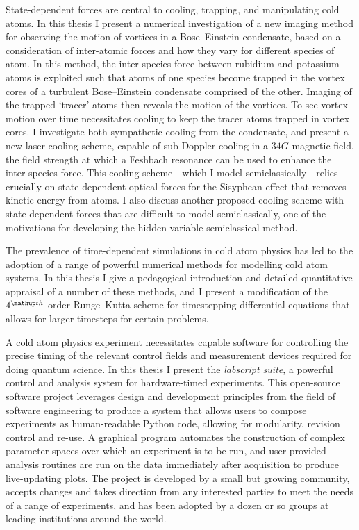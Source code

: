 State-dependent forces are central to cooling, trapping, and manipulating cold atoms. In this thesis I present a numerical investigation of a new imaging method for observing the motion of vortices in a Bose--Einstein condensate, based on a consideration of inter-atomic forces and how they vary for different species of atom. In this method, the inter-species force between rubidium and potassium atoms is exploited such that atoms of one species become trapped in the vortex cores of a turbulent Bose--Einstein condensate comprised of the other. Imaging of the trapped `tracer' atoms then reveals the motion of the vortices. To see vortex motion over time necessitates cooling to keep the tracer atoms trapped in vortex cores. I investigate both sympathetic cooling from the condensate, and present a new laser cooling scheme, capable of sub-Doppler cooling in a $34\unit{G}$ magnetic field, the field strength at which a Feshbach resonance can be used to enhance the inter-species force. This cooling scheme---which I model semiclassically---relies crucially on state-dependent optical forces for the Sisyphean effect that removes kinetic energy from atoms. I also discuss another proposed cooling scheme with state-dependent forces that are difficult to model semiclassically, one of the motivations for developing the hidden-variable semiclassical method.

The prevalence of time-dependent simulations in cold atom physics has led to the adoption of a range of powerful numerical methods for modelling cold atom systems. In this thesis I give a pedagogical introduction and detailed quantitative appraisal of a number of these methods, and I present a modification of the $4^\up{th}$ order Runge--Kutta scheme for timestepping differential equations that allows for larger timesteps for certain problems.

A cold atom physics experiment necessitates capable software for controlling the precise timing of the relevant control fields and measurement devices required for doing quantum science. In this thesis I present the \emph{labscript suite}, a powerful control and analysis system for hardware-timed experiments. This open-source software project leverages design and development principles from the field of software engineering to produce a system that allows users to compose experiments as human-readable Python code, allowing for modularity, revision control and re-use. A graphical program automates the construction of complex parameter spaces over which an experiment is to be run, and user-provided analysis routines are run on the data immediately after acquisition to produce live-updating plots. The project is developed by a small but growing community, accepts changes and takes direction from any interested parties to meet the needs of a range of experiments, and has been adopted by a dozen or so groups at leading institutions around the world.


